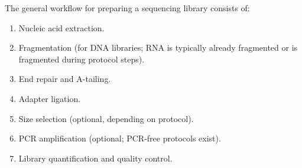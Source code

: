 The general workflow for preparing a sequencing library consists of:

\begin{enumerate}[nosep]
  \item Nucleic acid extraction.
  \item Fragmentation (for DNA libraries; RNA is typically already fragmented or is fragmented during protocol steps).
  \item End repair and A-tailing.
  \item Adapter ligation.
  \item Size selection (optional, depending on protocol).
  \item PCR amplification (optional; PCR-free protocols exist).
  \item Library quantification and quality control.
\end{enumerate}

